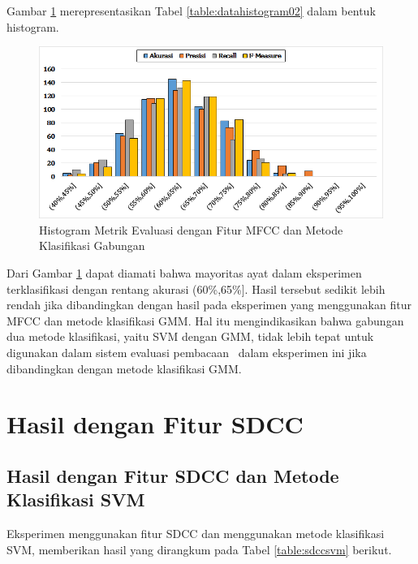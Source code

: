   Gambar \ref{fig:histogram02} merepresentasikan Tabel \ref{table:datahistogram02} dalam bentuk histogram.
  \begin{figure}
    \centering
    \includegraphics[width=\linewidth]{pics/histogram02}
    \caption{Histogram Metrik Evaluasi dengan Fitur MFCC dan Metode Klasifikasi Gabungan}
    \label{fig:histogram02}
  \end{figure}

  Dari Gambar \ref{fig:histogram02} dapat diamati bahwa mayoritas ayat dalam eksperimen terklasifikasi dengan rentang akurasi (60\%,65\%]. Hasil tersebut sedikit lebih rendah jika dibandingkan dengan hasil pada eksperimen yang menggunakan fitur MFCC dan metode klasifikasi GMM. Hal itu mengindikasikan bahwa gabungan dua metode klasifikasi, yaitu SVM dengan GMM, tidak lebih tepat untuk digunakan dalam sistem evaluasi pembacaan \quran~dalam eksperimen ini jika dibandingkan dengan metode klasifikasi GMM.





\section{Hasil dengan Fitur SDCC}

  \subsection{Hasil dengan Fitur SDCC dan Metode Klasifikasi SVM}
  Eksperimen menggunakan fitur SDCC dan menggunakan metode klasifikasi SVM, memberikan hasil yang dirangkum pada Tabel \ref{table:sdccsvm} berikut.

